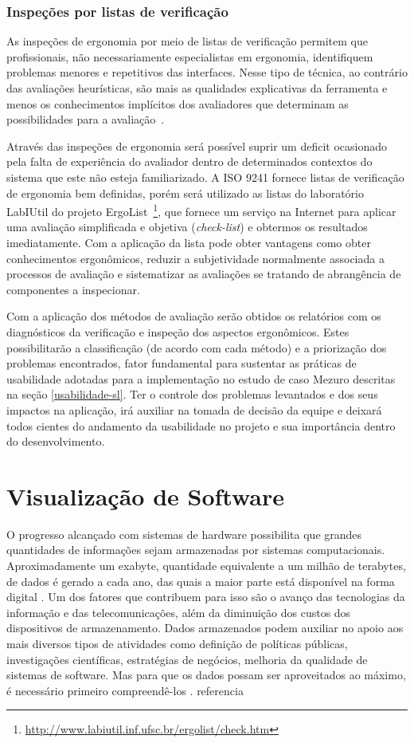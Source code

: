 \subsubsection{Inspeções por listas de verificação}
\label{inspeções-listas}
As inspeções de ergonomia por meio de listas de verificação permitem que
profissionais, não necessariamente especialistas em ergonomia, identifiquem
problemas menores e repetitivos das interfaces.
%
Nesse tipo de técnica, ao contrário das avaliações heurísticas, são mais as
qualidades explicativas da ferramenta e menos os conhecimentos implícitos dos
avaliadores que determinam as possibilidades para a avaliação~\cite{cybis2010}.

%
Através das inspeções de ergonomia será possível suprir um deficit ocasionado
pela falta de experiência do avaliador dentro de determinados contextos do
sistema que este não esteja familiarizado.
%
A ISO 9241 fornece listas de verificação de ergonomia bem definidas, porém será
utilizado as listas do laboratório LabIUtil do projeto
ErgoList~\footnote{\url{http://www.labiutil.inf.ufsc.br/ergolist/check.htm}},
que fornece um serviço na Internet para aplicar uma avaliação
simplificada e objetiva (\textit{check-list}) e obtermos os resultados
imediatamente.
%
Com a aplicação da lista pode obter vantagens como obter conhecimentos
ergonômicos, reduzir a subjetividade normalmente associada a processos de
avaliação e sistematizar as avaliações se tratando de abrangência de componentes
a inspecionar.

Com a aplicação dos métodos de avaliação serão obtidos os relatórios com os diagnósticos da verificação e inspeção dos aspectos ergonômicos. Estes possibilitarão a classificação (de acordo com cada método) e a priorização dos problemas encontrados, fator fundamental para sustentar as práticas de usabilidade adotadas para a implementação no estudo de caso Mezuro descritas na seção \ref{usabilidade-sl}. Ter o controle dos problemas levantados e dos seus impactos na aplicação, irá auxiliar na tomada de decisão da equipe e deixará todos cientes do andamento da usabilidade no projeto e sua importância dentro do desenvolvimento. 

\section{Visualização de Software}
\label{sec-visualizacao}
O progresso alcançado com sistemas de hardware possibilita que grandes quantidades de informações sejam armazenadas por sistemas computacionais. Aproximadamente um exabyte, quantidade equivalente a um milhão de terabytes, de dados é gerado a cada ano, das quais a maior parte está disponível na forma digital \cite{keim2002information}. Um dos fatores que contribuem para isso são o avanço das tecnologias da informação e das telecomunicações, além da diminuição dos custos dos dispositivos de armazenamento. Dados armazenados podem auxiliar no apoio aos mais diversos tipos de atividades como definição de políticas públicas, investigações científicas, estratégias de negócios, melhoria da qualidade de sistemas de software. Mas para que os dados possam ser aproveitados ao máximo, é necessário primeiro compreendê-los \cite{heer2012interactive}. referencia

